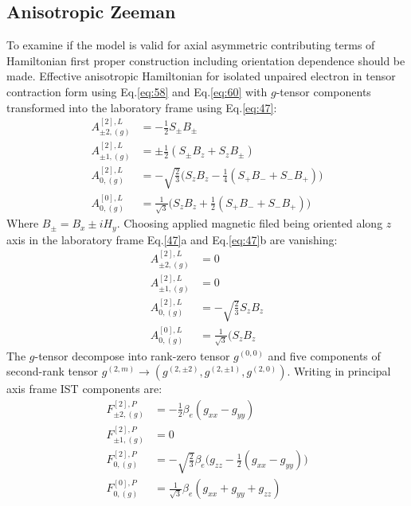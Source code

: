 \subsection{Anisotropic Zeeman}\label{zeemansection}
To examine if the model is valid for axial asymmetric contributing terms of Hamiltonian first proper construction including orientation dependence should be made. Effective anisotropic Hamiltonian for isolated unpaired electron in tensor contraction form using Eq.\ref{eq:58} and Eq.\ref{eq:60} with $g$-tensor components transformed into the laboratory frame\cite{NMRtomograph}\cite{nordio} using Eq.\ref{eq:47}:
\begin{subequations}\label{eq:48}
\begin{align}
A^{[2],L}_{\pm2,(g)} & =-\frac{1}{2}S_{\pm}B_{\pm}\\
A^{[2],L}_{\pm1,(g)} & =\pm\frac{1}{2}(S_{\pm}B_{z}+S_zB_{\pm})\\
A^{[2],L}_{0,(g)} & =-\sqrt{\frac{2}{3}}\big(S_{z}B_{z}-\frac{1}{4}(S_+B_-+S_-B_+)\big)\\
A^{[0],L}_{0,(g)} & =\frac{1}{\sqrt{3}}\big(S_{z}B_{z}+\frac{1}{2}(S_+B_-+S_-B_+)\big)
\end{align}
\end{subequations}
Where $B_{\pm}=B_x\pm iH_y$. Choosing applied magnetic filed being oriented along $z$ axis in the laboratory frame  Eq.\ref{47}a and Eq.\ref{eq:47}b are vanishing: 
\begin{subequations}\label{eq:49}
\begin{align}
A^{[2],L}_{\pm2,(g)} & =0\\
A^{[2],L}_{\pm1,(g)} & =0\\
A^{[2],L}_{0,(g)} & =-\sqrt{\frac{2}{3}}S_{z}B_{z}\\
A^{[0],L}_{0,(g)} & = \frac{1}{\sqrt{3}}(S_{z}B_{z}
\end{align}
\end{subequations}
The $g$-tensor decompose into rank-zero tensor $g^{(0,0)}$ and five components of second-rank tensor $g^{(2,m)}\rightarrow(g^{(2,\pm2)}, g^{(2,\pm1)},g^{(2,0)})$. Writing in principal axis frame IST components are: 
\begin{subequations}\label{eq:50}
\begin{align}
F^{[2],P}_{\pm2,(g)} & =-\frac{1}{2}\beta_e(g_{xx}-g_{yy})\\
F^{[2],P}_{\pm1,(g)} & =0\\
F^{[2],P}_{0,(g)} & =-\sqrt{\frac{2}{3}}\beta_e\big(g_{zz}-\frac{1}{2}(g_{xx}-g_{yy})\big)\\
F^{[0],P}_{0,(g)} & = \frac{1}{\sqrt{3}}\beta_e(g_{xx}+g_{yy}+g_{zz})
\end{align}
\end{subequations}
